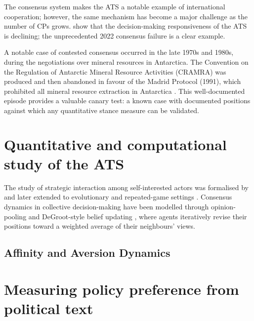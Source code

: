 The consensus system makes the ATS a notable example of international cooperation; however, the same mechanism 
has become a major challenge as the number of CPs grows. \textcite{Gardiner2025} show that the decision-making 
responsiveness of the ATS is declining; the unprecedented 2022 consensus failure is a clear example.

A notable case of contested consensus occurred in the late 1970s and 1980s, during the negotiations over mineral
resources in Antarctica. The Convention on the Regulation of Antarctic Mineral Resource Activities (CRAMRA) was
produced and then abandoned in favour of the Madrid Protocol (1991), which prohibited all mineral resource 
extraction in Antarctica \parencite{jackson2021antarctica}. This well-documented episode provides a valuable canary
test: a known case with documented positions against which any quantitative stance measure can be validated.


\section{Quantitative and computational study of the ATS}
\label{sec:gametheory}

The study of strategic interaction among self-interested actors was formalised by
\textcite{Nash1951} and later extended to evolutionary and repeated-game settings
\parencite{Axelrod1984, Osborne1994}.
Consensus dynamics in collective decision-making have been modelled through opinion-pooling
and DeGroot-style belief updating \parencite{DeGroot1974}, where agents iteratively revise
their positions toward a weighted average of their neighbours' views.


\subsection{Affinity and Aversion Dynamics}
\label{sec:affinity-aversion}


\section{Measuring policy preference from political text}
\label{sec:computational-ir}

